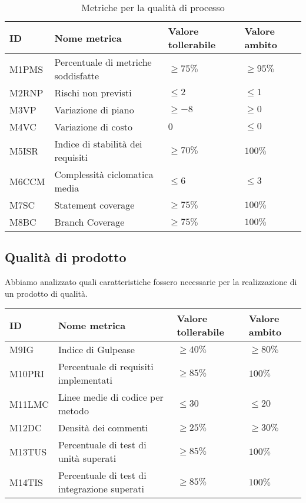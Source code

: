  {\renewcommand{\arraystretch}{1.5}
 \begin{table}[H]
    \begin{tabularx}{\textwidth}{p{}|p{}|X|X}
    \textbf{ID} & \textbf{Nome metrica} & \textbf{Valore tollerabile} & \textbf{Valore ambito}  \\
    \hline
     M1PMS & Percentuale di metriche soddisfatte & $ \ge75\% $& $\ge95\% $\\
    \hline
     M2RNP & Rischi non previsti & $ \le2 $& $\le1 $\\
    \hline
     M3VP & Variazione di piano & $ \ge-8 $ & $ \ge0 $ \\
    \hline
     M4VC & Variazione di costo & $0$ & $\le0 $ \\
    \hline
     M5ISR &  Indice di stabilità dei requisiti & $ \ge70\% $ & $ 100\% $  \\
    \hline
     M6CCM & Complessità ciclomatica media & $\le6 $ & $\le3 $ \\
    \hline
    M7SC & Statement coverage & $ \ge75\% $ & $ 100\% $ \\
    
    \hline
     M8BC & Branch Coverage & $ \ge75\% $ & $ 100\% $ \\
    \end{tabularx}
    \caption{Metriche per la qualità di processo}
    \end{table}
    
\subsection{Qualità di prodotto}
Abbiamo analizzato quali caratteristiche fossero necessarie per la realizzazione di un prodotto di 
qualità.\\
 {\renewcommand{\arraystretch}{1.5}
 \begin{table}[H]
  \begin{tabularx}{\textwidth}{p{}|p{}|X|X}
    \textbf{ID} & \textbf{Nome metrica} & \textbf{Valore tollerabile} & \textbf{Valore ambito}  \\
    \hline
     M9IG & Indice di Gulpease & $ \ge40\% $& $\ge80\% $\\
    \hline
     M10PRI & Percentuale di requisiti implementati & $ \ge85\% $ & $ 100\% $ \\
    \hline
     M11LMC & Linee medie di codice per metodo & $\le30$ & $\le20$ \\
    \hline
    M12DC & Densità dei commenti & $\ge25\%$ & $\ge30\%$ \\
    \hline
     M13TUS & Percentuale di test di unità superati & $ \ge85\% $& $100\%$\\
    \hline
     M14TIS & Percentuale di test di integrazione superati & $ \ge85\% $& $100\%$\\
    

\end{tabularx}
\end{table}}}
